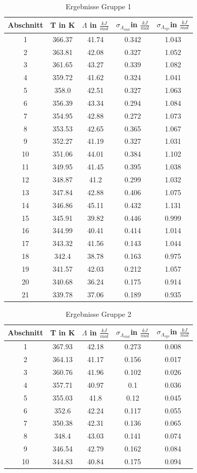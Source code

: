 \documentclass[10pt,a4paper]{article}
\begin{document}
\begin{table}[H]\centering
\caption{Ergebnisse Gruppe 1}

\begin{tabular}{c|c|c|c|c}
Abschnitt&T in K&$\Lambda$ in $\frac{kJ}{mol}$&$\sigma_{\Lambda_{stat}}$in $\frac{kJ}{mol}$&$\sigma_{\Lambda_{sys}}$in $\frac{kJ}{mol}$\\
\hline
1&366.37&41.74&0.342&1.043\\
2&363.81&42.08&0.327&1.052\\
3&361.65&43.27&0.339&1.082\\
4&359.72&41.62&0.324&1.041\\
5&358.0&42.51&0.327&1.063\\
6&356.39&43.34&0.294&1.084\\
7&354.95&42.88&0.272&1.073\\
8&353.53&42.65&0.365&1.067\\
9&352.27&41.19&0.327&1.031\\
10&351.06&44.01&0.384&1.102\\
11&349.95&41.45&0.395&1.038\\
12&348.87&41.2&0.299&1.032\\
13&347.84&42.88&0.406&1.075\\
14&346.86&45.11&0.432&1.131\\
15&345.91&39.82&0.446&0.999\\
16&344.99&40.41&0.414&1.014\\
17&343.32&41.56&0.143&1.044\\
18&342.4&38.78&0.163&0.975\\
19&341.57&42.03&0.212&1.057\\
20&340.68&36.24&0.175&0.914\\
21&339.78&37.06&0.189&0.935\\
\end{tabular}
\end{table}
\begin{table}[H]\centering
\caption{Ergebnisse Gruppe 2}

\begin{tabular}{c|c|c|c|c}
Abschnitt&T in K&$\Lambda$ in $\frac{kJ}{mol}$&$\sigma_{\Lambda_{stat}}$in $\frac{kJ}{mol}$&$\sigma_{\Lambda_{sys}}$in $\frac{kJ}{mol}$\\
\hline
1&367.93&42.18&0.273&0.008\\
2&364.13&41.17&0.156&0.017\\
3&360.76&41.96&0.102&0.026\\
4&357.71&40.97&0.1&0.036\\
5&355.03&41.8&0.12&0.045\\
6&352.6&42.24&0.117&0.055\\
7&350.38&42.31&0.136&0.065\\
8&348.4&43.03&0.141&0.074\\
9&346.54&42.79&0.162&0.084\\
10&344.83&40.84&0.175&0.094\\
\end{tabular}
\end{table}
\end{document}
